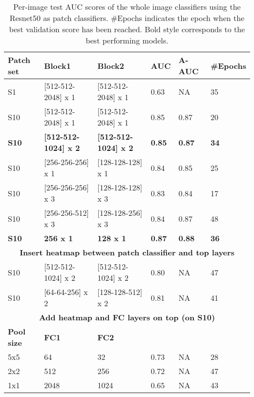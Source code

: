 \documentclass[12pt,letterpaper]{article}
\begin{document}
\begin{table}
\centering
\caption{Per-image test AUC scores of the whole image classifiers using the Resnet50 as patch classifiers. \#Epochs indicates the epoch when the best validation score has been reached. Bold style corresponds to the best performing models.}
\label{tab:resnet_auc}
\begin{tabular}{@{}llllll@{}}
\toprule
\textbf{Patch set} & \textbf{Block1} & \textbf{Block2} & \textbf{AUC} & \textbf{A-AUC} & \textbf{\#Epochs} \\ \midrule
S1 & {[}512-512-2048{]} x 1 & {[}512-512-2048{]} x 1 & 0.63 & NA & 35 \\
S10 & {[}512-512-2048{]} x 1 & {[}512-512-2048{]} x 1 & 0.85 & 0.87 & 20 \\
\textbf{S10} & \textbf{{[}512-512-1024{]} x 2} & \textbf{{[}512-512-1024{]} x 2} & \textbf{0.85} & \textbf{0.87} & \textbf{34} \\
S10 & {[}256-256-256{]} x 1 & {[}128-128-128{]} x 1 & 0.84 & 0.85 & 25 \\
S10 & {[}256-256-256{]} x 3 & {[}128-128-128{]} x 3 & 0.83 & 0.84 & 17 \\
S10 & {[}256-256-512{]} x 3 & {[}128-128-256{]} x 3 & 0.84 & 0.87 & 48 \\
\textbf{S10} & \textbf{256 x 1} & \textbf{128 x 1} & \textbf{0.87} & \textbf{0.88} & \textbf{36} \\ \midrule
\multicolumn{6}{c}{\textbf{Insert heatmap between patch classifier and top layers}} \\ \midrule
S10 & {[}512-512-1024{]} x 2 & {[}512-512-1024{]} x 2 & 0.80 & NA & 47 \\
S10 & {[}64-64-256{]} x 2 & {[}128-128-512{]} x 2 & 0.81 & NA & 41 \\ \midrule
\multicolumn{6}{c}{\textbf{Add heatmap and FC layers on top (on S10)}} \\ \midrule
\textbf{Pool size} & \textbf{FC1} & \textbf{FC2} & \textbf{} & \textbf{} & \textbf{} \\
5x5 & 64 & 32 & 0.73 & NA & 28 \\
2x2 & 512 & 256 & 0.72 & NA & 47 \\
1x1 & 2048 & 1024 & 0.65 & NA & 43 \\ \bottomrule
\end{tabular}
\end{table}
\end{document}

